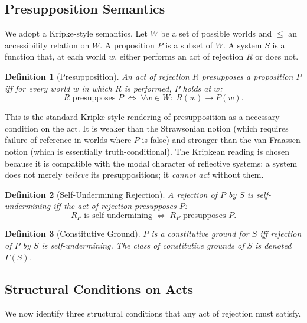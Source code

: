 \documentclass[11pt]{article}
\newtheorem{definition}{Definition}
\theoremstyle{remark}
\begin{document}
\subsection{Presupposition Semantics}

We adopt a Kripke-style semantics. Let \(W\) be a set of possible worlds and \(\leq\) an accessibility relation on \(W\). A proposition \(P\) is a subset of \(W\). A system \(S\) is a function that, at each world \(w\), either performs an act of rejection \(R\) or does not.

\begin{definition}[Presupposition]
An act of rejection \(R\) \emph{presupposes} a proposition \(P\) iff for every world \(w\) in which \(R\) is performed, \(P\) holds at \(w\):
\[
R \text{ presupposes } P \;\iff\; \forall w \in W:\; R(w) \to P(w).
\]
\end{definition}

This is the standard Kripke-style rendering of presupposition as a necessary condition on the act. It is weaker than the Strawsonian notion (which requires failure of reference in worlds where \(P\) is false) and stronger than the van Fraassen notion (which is essentially truth-conditional). The Kripkean reading is chosen because it is compatible with the modal character of reflective systems: a system does not merely \emph{believe} its presuppositions; it \emph{cannot act} without them.

\begin{definition}[Self-Undermining Rejection]
A rejection of \(P\) by \(S\) is \emph{self-undermining} iff the act of rejection presupposes \(P\):
\[
R_P \text{ is self-undermining} \;\iff\; R_P \text{ presupposes } P.
\]
\end{definition}

\begin{definition}[Constitutive Ground]
\(P\) is a \emph{constitutive ground} for \(S\) iff rejection of \(P\) by \(S\) is self-undermining. The class of constitutive grounds of \(S\) is denoted \(\Gamma(S)\).
\end{definition}

\subsection{Structural Conditions on Acts}

We now identify three structural conditions that any act of rejection must satisfy.
\end{document}
